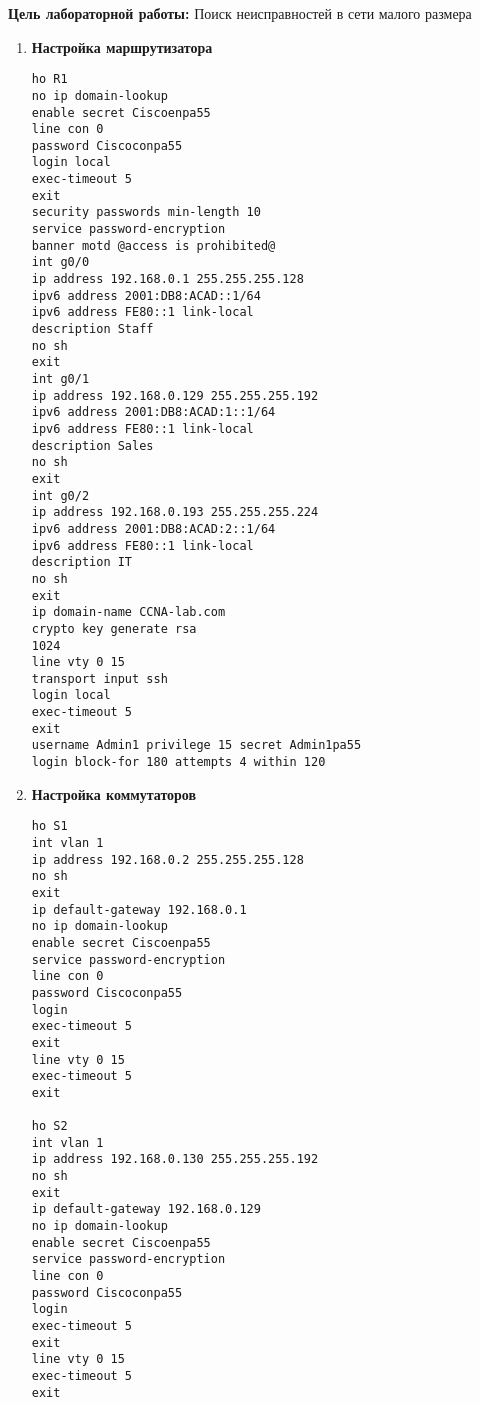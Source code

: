\documentclass[a4paper,14pt]{extarticle}
\begin{document}
    \textbf{Цель лабораторной работы:}
    Поиск неисправностей в сети малого размера
    

    \begin{enumerate}
        \item \textbf{Настройка маршрутизатора}
        \begin{lstlisting}
ho R1
no ip domain-lookup
enable secret Ciscoenpa55
line con 0 
password Ciscoconpa55
login local
exec-timeout 5
exit
security passwords min-length 10
service password-encryption
banner motd @access is prohibited@
int g0/0
ip address 192.168.0.1 255.255.255.128
ipv6 address 2001:DB8:ACAD::1/64
ipv6 address FE80::1 link-local
description Staff
no sh
exit
int g0/1
ip address 192.168.0.129 255.255.255.192
ipv6 address 2001:DB8:ACAD:1::1/64
ipv6 address FE80::1 link-local
description Sales
no sh
exit
int g0/2
ip address 192.168.0.193 255.255.255.224
ipv6 address 2001:DB8:ACAD:2::1/64
ipv6 address FE80::1 link-local
description IT
no sh
exit
ip domain-name CCNA-lab.com
crypto key generate rsa
1024
line vty 0 15
transport input ssh
login local
exec-timeout 5
exit 
username Admin1 privilege 15 secret Admin1pa55
login block-for 180 attempts 4 within 120
        \end{lstlisting}
        \item \textbf{Настройка коммутаторов}
        \begin{lstlisting}
ho S1
int vlan 1 
ip address 192.168.0.2 255.255.255.128
no sh
exit
ip default-gateway 192.168.0.1
no ip domain-lookup
enable secret Ciscoenpa55
service password-encryption
line con 0 
password Ciscoconpa55
login 
exec-timeout 5
exit
line vty 0 15
exec-timeout 5
exit 

ho S2
int vlan 1 
ip address 192.168.0.130 255.255.255.192
no sh
exit
ip default-gateway 192.168.0.129
no ip domain-lookup
enable secret Ciscoenpa55
service password-encryption
line con 0 
password Ciscoconpa55
login 
exec-timeout 5
exit
line vty 0 15
exec-timeout 5
exit 


\end{lstlisting}
\end{enumerate}
\end{document}
